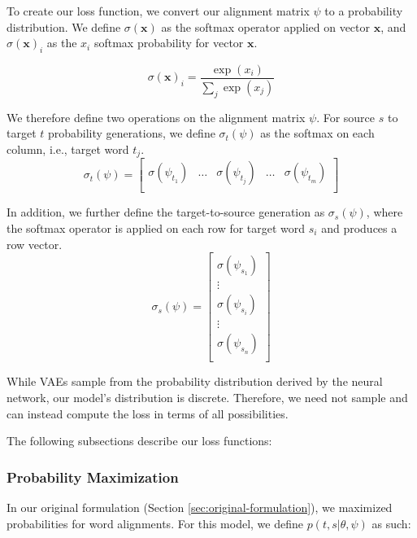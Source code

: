 \documentclass[twoside,twocolumn]{article}
\renewcommand{\vec}[1]{\mathbf{#1}}
\begin{document}
To create our loss function, we convert our alignment matrix $\psi$
to a probability distribution. We define $\sigma(\vec{x})$ as
the softmax operator applied on vector $\vec{x}$, and $\sigma(\vec{x})_i$ as
the $x_i$ softmax probability for vector $\vec{x}$.

\begin{equation}
\sigma(\vec{x})_i = \frac{\exp(x_i)}{\sum_j\exp(x_j)}
\end{equation}

We therefore define two operations on the alignment matrix $\psi$. For source
$s$ to target $t$ probability generations, we define $\sigma_t(\psi)$ as the
softmax on each column, i.e., target word $t_j$.
\begin{equation}
  \sigma_t(\psi) = \left[
    \begin{matrix}
      \sigma(\psi_{t_1}) &
      \hdots &
      \sigma(\psi_{t_j}) &
      \hdots &
      \sigma(\psi_{t_m})  \\
    \end{matrix}
\right]
\end{equation}

In addition, we further define the target-to-source generation as
$\sigma_s(\psi)$, where the softmax operator is applied on each row for target
word $s_i$ and produces a row vector.
\begin{equation}
  \sigma_s(\psi) = \left[
    \begin{matrix}
      \sigma(\psi_{s_1})  \\
      \vdots \\
      \sigma(\psi_{s_i})  \\
      \vdots \\
      \sigma(\psi_{s_n})  \\
    \end{matrix}
\right]
\end{equation}

While VAEs sample from the probability distribution derived by the neural
network, our model's distribution is discrete. Therefore, we need not
sample and can instead compute the loss in terms of all possibilities.

The following subsections describe our loss functions:

\subsubsection{Probability Maximization}

In our original formulation (Section \ref{sec:original-formulation}), we
maximized probabilities for word alignments.
For this model, we define $p(t, s | \theta, \psi)$ as such:
\end{document}
